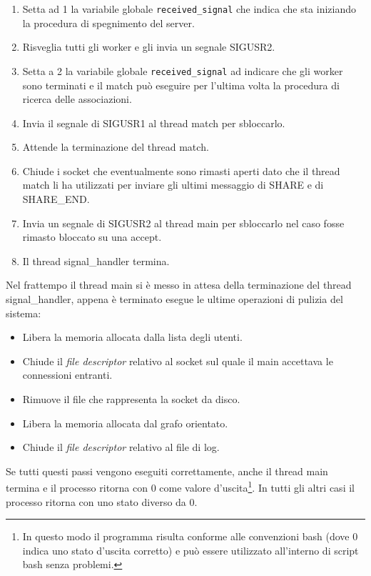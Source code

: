 \documentclass[a4paper,10pt]{article}
\begin{document}
\begin{enumerate}
	\item Setta ad 1 la variabile globale \texttt{received\_signal} che indica che sta iniziando la procedura di spegnimento del server.
	\item Risveglia tutti gli worker e gli invia un segnale SIGUSR2.
	\item Setta a 2 la variabile globale \texttt{received\_signal} ad indicare che gli worker sono terminati e il match pu\`o eseguire per l'ultima volta la procedura di ricerca delle associazioni.
	\item Invia il segnale di SIGUSR1 al thread match per sbloccarlo.
	\item Attende la terminazione del thread match.
	\item Chiude i socket che eventualmente sono rimasti aperti dato che il thread match li ha utilizzati per inviare gli ultimi messaggio di SHARE e di SHARE\_END.
	\item Invia un segnale di SIGUSR2 al thread main per sbloccarlo nel caso fosse rimasto bloccato su una accept.
	\item Il thread signal\_handler termina.
\end{enumerate}

Nel frattempo il thread main si \`e messo in attesa della terminazione del thread signal\_handler, appena \`e terminato esegue le ultime operazioni di pulizia del sistema:
\begin{itemize}
	\item Libera la memoria allocata dalla lista degli utenti.
	\item Chiude il \emph{file descriptor} relativo al socket sul quale il main accettava le connessioni entranti.
	\item Rimuove il file che rappresenta la socket da disco.
	\item Libera la memoria allocata dal grafo orientato.
	\item Chiude il \textit{file descriptor} relativo al file di log.
\end{itemize}

Se tutti questi passi vengono eseguiti correttamente, anche il thread main termina e il processo ritorna con 0 come valore d'uscita\footnote{In questo modo il programma risulta conforme alle convenzioni bash (dove 0 indica uno stato d'uscita corretto) e pu\`o essere utilizzato all'interno di script bash senza problemi.}. In tutti gli altri casi il processo ritorna con uno stato diverso da 0.
\end{document}
